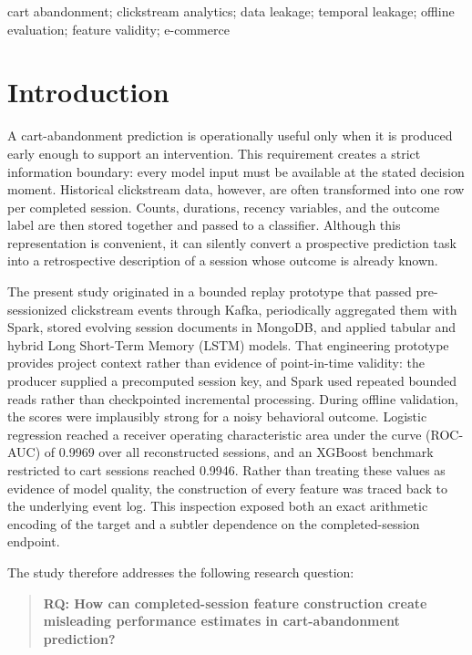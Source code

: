 \documentclass[conference, letterpaper]{IEEEtran}
\begin{document}
\begin{IEEEkeywords}
cart abandonment; clickstream analytics; data leakage; temporal leakage; offline evaluation; feature validity; e-commerce
\end{IEEEkeywords}

\section{Introduction}
A cart-abandonment prediction is operationally useful only when it is produced early enough to support an intervention. This requirement creates a strict information boundary: every model input must be available at the stated decision moment. Historical clickstream data, however, are often transformed into one row per completed session. Counts, durations, recency variables, and the outcome label are then stored together and passed to a classifier. Although this representation is convenient, it can silently convert a prospective prediction task into a retrospective description of a session whose outcome is already known.

The present study originated in a bounded replay prototype that passed pre-sessionized clickstream events through Kafka, periodically aggregated them with Spark, stored evolving session documents in MongoDB, and applied tabular and hybrid Long Short-Term Memory (LSTM) models. That engineering prototype provides project context rather than evidence of point-in-time validity: the producer supplied a precomputed session key, and Spark used repeated bounded reads rather than checkpointed incremental processing. During offline validation, the scores were implausibly strong for a noisy behavioral outcome. Logistic regression reached a receiver operating characteristic area under the curve (ROC-AUC) of 0.9969 over all reconstructed sessions, and an XGBoost benchmark restricted to cart sessions reached 0.9946. Rather than treating these values as evidence of model quality, the construction of every feature was traced back to the underlying event log. This inspection exposed both an exact arithmetic encoding of the target and a subtler dependence on the completed-session endpoint.

The study therefore addresses the following research question:
\begin{quote}
\textbf{RQ: How can completed-session feature construction create misleading performance estimates in cart-abandonment prediction?}
\end{quote}
\end{document}
